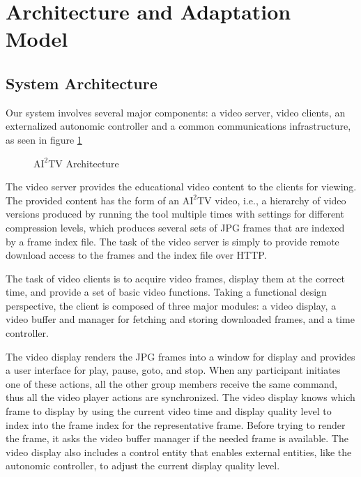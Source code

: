 \documentclass{sig-alternate}
\begin{document}

\section{Architecture and Adaptation\\ Model}
\subsection{System Architecture}
Our system involves several major components: a video server, video
clients, an externalized autonomic controller and a common
communications infrastructure, as seen in figure \ref{ai2tv_arch}

\begin{figure}
  \centering
  \caption{$\mathrm{AI}^2$TV Architecture}
  \label{ai2tv_arch}
\end{figure}

The video server provides the educational video content to the clients
for viewing.  The provided content has the form of an
$\mathrm{AI}^2$TV video, i.e., a hierarchy of video versions produced
by running the tool multiple times with settings for different
compression levels, which produces several sets of JPG frames that are
indexed by a frame index file.  The task of the video server is simply
to provide remote download access to the frames and the index file
over HTTP.

The task of video clients is to acquire video frames, display them at
the correct time, and provide a set of basic video functions.  Taking
a functional design perspective, the client is composed of three major
modules: a video display, a video buffer and manager for fetching and
storing downloaded frames, and a time controller.

The video display renders the JPG frames into a window for display and
provides a user interface for play, pause, goto, and stop.  When any
participant initiates one of these actions, all the other group
members receive the same command, thus all the video player actions
are synchronized.  The video display knows which frame to display by
using the current video time and display quality level to index into
the frame index for the representative frame.  Before trying to render
the frame, it asks the video buffer manager if the needed frame is
available.  The video display also includes a control entity that
enables external entities, like the autonomic controller, to adjust
the current display quality level.
\end{document}
